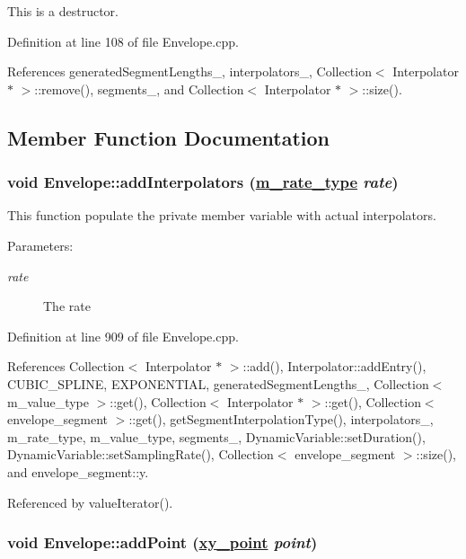 This is a destructor. 

Definition at line 108 of file Envelope.cpp.

References generated\-Segment\-Lengths\_\-, interpolators\_\-, Collection$<$ Interpolator $\ast$ $>$::remove(), segments\_\-, and Collection$<$ Interpolator $\ast$ $>$::size().

\subsection{Member Function Documentation}
\hypertarget{classEnvelope_d0}{
\subsubsection[addInterpolators]{\setlength{\rightskip}{0pt plus 5cm}void Envelope::add\-Interpolators (\hyperlink{Types_8h_a4}{m\_\-rate\_\-type} {\em rate})}}
\label{classEnvelope_d0}


This function populate the private member variable with actual interpolators. \begin{Desc}
\item[Parameters:]
\begin{description}
\item[{\em rate}]The rate \end{description}
\end{Desc}


Definition at line 909 of file Envelope.cpp.

References Collection$<$ Interpolator $\ast$ $>$::add(), Interpolator::add\-Entry(), CUBIC\_\-SPLINE, EXPONENTIAL, generated\-Segment\-Lengths\_\-, Collection$<$ m\_\-value\_\-type $>$::get(), Collection$<$ Interpolator $\ast$ $>$::get(), Collection$<$ envelope\_\-segment $>$::get(), get\-Segment\-Interpolation\-Type(), interpolators\_\-, m\_\-rate\_\-type, m\_\-value\_\-type, segments\_\-, Dynamic\-Variable::set\-Duration(), Dynamic\-Variable::set\-Sampling\-Rate(), Collection$<$ envelope\_\-segment $>$::size(), and envelope\_\-segment::y.

Referenced by value\-Iterator().\hypertarget{classEnvelope_a18}{
\subsubsection[addPoint]{\setlength{\rightskip}{0pt plus 5cm}void Envelope::add\-Point (\hyperlink{structxy__point}{xy\_\-point} {\em point})}}
\label{classEnvelope_a18}


